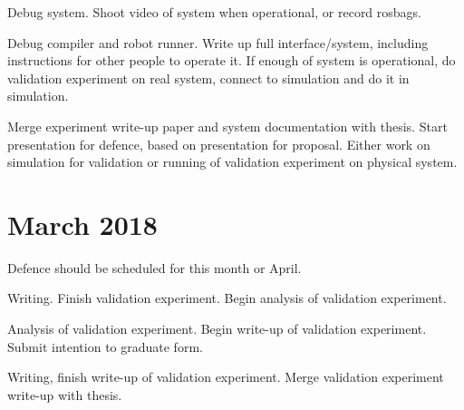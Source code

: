 Debug system. 
Shoot video of system when operational, or record rosbags. 


Debug compiler and robot runner. 
Write up full interface/system, including instructions for other people to operate it. 
If enough of system is operational, do validation experiment on real system, connect to simulation and do it in simulation. 


Merge experiment write-up paper and system documentation with thesis.
Start presentation for defence, based on presentation for proposal. 
Either work on simulation for validation or running of validation experiment on physical system. 

\section{March 2018} \label{section:March_2018}

Defence should be scheduled for this month or April. 


Writing.
Finish validation experiment.
Begin analysis of validation experiment. 


Analysis of validation experiment. 
Begin write-up of validation experiment. 
Submit intention to graduate form. 


Writing, finish write-up of validation experiment. Merge validation experiment write-up with thesis. 

